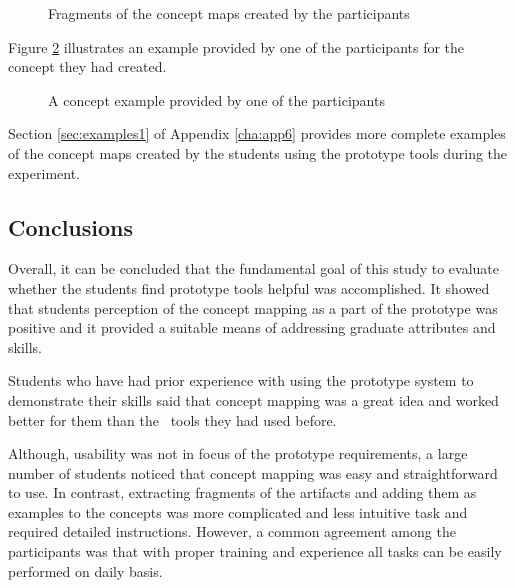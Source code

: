 \begin{figure}[htb]
\centering
\setlength\fboxsep{0pt}
\setlength\fboxrule{0.5pt}
\caption{Fragments of the concept maps created by the participants}
\label{fig:stdmap}
\end{figure}

\FloatBarrier

Figure \ref{fig:stdmap2} illustrates an example provided by one of the
participants for the concept they had created.

\begin{figure}[htb]
\centering
\setlength\fboxsep{0pt}
\setlength\fboxrule{0.5pt}
\caption{A concept example provided by one of the participants}
\label{fig:stdmap2}
\end{figure}

Section \ref{sec:examples1} of Appendix \ref{cha:app6} provides more complete
examples of the concept maps created by the students using the prototype tools
during the experiment.

\subsection{Conclusions}

Overall, it can be concluded that the fundamental goal of this study to
evaluate whether the students find prototype tools helpful was accomplished. It
showed that students perception of the concept mapping as a part of the
prototype was positive and it provided a suitable means of addressing graduate
attributes and \LLLs skills.

Students who have had prior experience with using the prototype system to
demonstrate their \LLLs skills said that concept mapping was a great idea and
worked better for them than the \ep~tools they had used before.

Although, usability was not in focus of the prototype requirements, a large
number of students noticed that concept mapping was easy and straightforward to
use. In contrast, extracting fragments of the artifacts and adding them as
examples to the concepts was more complicated and less intuitive task and
required detailed instructions. However, a common agreement among the
participants was that with proper training and experience all tasks can be
easily performed on daily basis.


